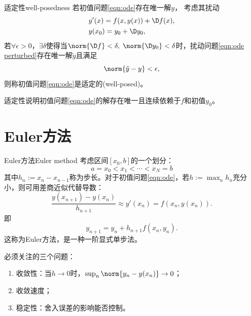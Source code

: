 \begin{definition}
    {适定性}{well-posedness}
    若初值问题\eqref{eqn:ode}存在唯一解$y$，
    考虑其扰动
    \begin{subequations}
        \label{eqn:ode perturbed}
        \begin{align}
            &y'(x)=f(x,y(x))+\D f(x),\\
            &y(x_0)=y_0+\D y_0,
        \end{align}
    \end{subequations}
    若$\forall\epsilon>0$，$\exists\delta$使得当$\norm{\D f}<\delta,\;\norm{\D y_0}<\delta$时，扰动问题\eqref{eqn:ode perturbed}存在唯一解$\tilde y$且满足
    \begin{equation}
        \norm{\tilde y-y}<\epsilon,
    \end{equation}
    则称初值问题\eqref{eqn:ode}是适定的(well-posed)。
\end{definition}

\begin{remark}
    适定性说明初值问题\eqref{eqn:ode}的解存在唯一且连续依赖于$f$和初值$y_0$。
\end{remark}

\section{Euler方法}

\begin{theorem}
    {Euler方法}{Euler method}
    考虑区间$[x_0,b]$的一个划分：
    \[
        a=x_0<x_1<\cdots<x_N=b
    \]
    其中$h_n:=x_n-x_{n-1}$称为步长。对于初值问题\eqref{eqn:ode}，若$h:=\max_n h_n$充分小，则可用差商近似代替导数：
    \[
        \frac{y(x_{n+1})-y(x_n)}{h_{n+1}}\approx y'(x_n)=f(x_n,y(x_n)).
    \]
    即
    \begin{equation}
        \label{eqn:Euler}
        y_{n+1}=y_n+h_{n+1}f(x_n,y_n).
    \end{equation}
    这称为Euler方法，是一种一阶显式单步法。
\end{theorem}

\begin{remark}
    必须关注的三个问题：
    \begin{enumerate}
        \item 收敛性：当$h\to0$时，$\sup_n\norm{y_n-y(x_n)}\to0$；
        \item 收敛速度；
        \item 稳定性：舍入误差的影响能否控制。
    \end{enumerate}
\end{remark}

